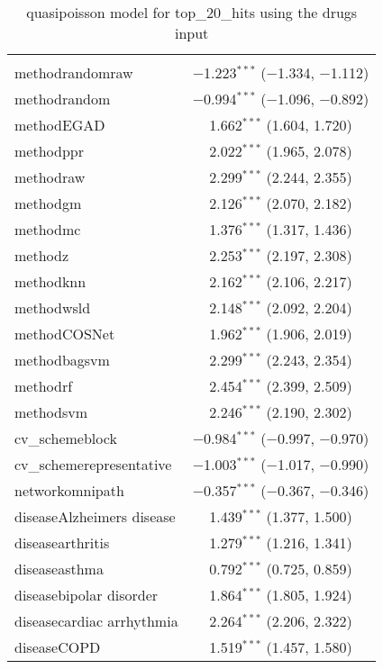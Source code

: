 
\begin{table}[!htbp] \centering 
  \caption{quasipoisson model for top_20_hits using the drugs input} 
  \label{} 
\begin{tabular}{@{\extracolsep{5pt}}lc} 
\\[-1.8ex]\hline 
\hline \\[-1.8ex] 
 methodrandomraw & $-$1.223$^{***}$ ($-$1.334, $-$1.112) \\ 
  methodrandom & $-$0.994$^{***}$ ($-$1.096, $-$0.892) \\ 
  methodEGAD & 1.662$^{***}$ (1.604, 1.720) \\ 
  methodppr & 2.022$^{***}$ (1.965, 2.078) \\ 
  methodraw & 2.299$^{***}$ (2.244, 2.355) \\ 
  methodgm & 2.126$^{***}$ (2.070, 2.182) \\ 
  methodmc & 1.376$^{***}$ (1.317, 1.436) \\ 
  methodz & 2.253$^{***}$ (2.197, 2.308) \\ 
  methodknn & 2.162$^{***}$ (2.106, 2.217) \\ 
  methodwsld & 2.148$^{***}$ (2.092, 2.204) \\ 
  methodCOSNet & 1.962$^{***}$ (1.906, 2.019) \\ 
  methodbagsvm & 2.299$^{***}$ (2.243, 2.354) \\ 
  methodrf & 2.454$^{***}$ (2.399, 2.509) \\ 
  methodsvm & 2.246$^{***}$ (2.190, 2.302) \\ 
  cv\_schemeblock & $-$0.984$^{***}$ ($-$0.997, $-$0.970) \\ 
  cv\_schemerepresentative & $-$1.003$^{***}$ ($-$1.017, $-$0.990) \\ 
  networkomnipath & $-$0.357$^{***}$ ($-$0.367, $-$0.346) \\ 
  diseaseAlzheimers disease & 1.439$^{***}$ (1.377, 1.500) \\ 
  diseasearthritis & 1.279$^{***}$ (1.216, 1.341) \\ 
  diseaseasthma & 0.792$^{***}$ (0.725, 0.859) \\ 
  diseasebipolar disorder & 1.864$^{***}$ (1.805, 1.924) \\ 
  diseasecardiac arrhythmia & 2.264$^{***}$ (2.206, 2.322) \\ 
  diseaseCOPD & 1.519$^{***}$ (1.457, 1.580) \\ 

\end{tabular}
\end{table}

